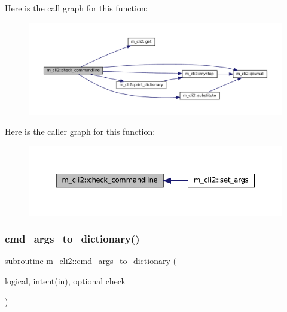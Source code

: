 Here is the call graph for this function\+:
\nopagebreak
\begin{figure}[H]
\begin{center}
\leavevmode
\includegraphics[width=350pt]{namespacem__cli2_ada8b5e7a86778085f55821ec31c5977a_cgraph}
\end{center}
\end{figure}
Here is the caller graph for this function\+:
\nopagebreak
\begin{figure}[H]
\begin{center}
\leavevmode
\includegraphics[width=350pt]{namespacem__cli2_ada8b5e7a86778085f55821ec31c5977a_icgraph}
\end{center}
\end{figure}
\mbox{\label{namespacem__cli2_a3348b0c76dadd62c536e06f82bcb0331}} 
\subsubsection{\texorpdfstring{cmd\+\_\+args\+\_\+to\+\_\+dictionary()}{cmd\_args\_to\_dictionary()}}
{\footnotesize\ttfamily subroutine m\+\_\+cli2\+::cmd\+\_\+args\+\_\+to\+\_\+dictionary (\begin{DoxyParamCaption}\item[{logical, intent(in), optional}]{check }\end{DoxyParamCaption})\hspace{0.3cm}{\ttfamily [private]}}



